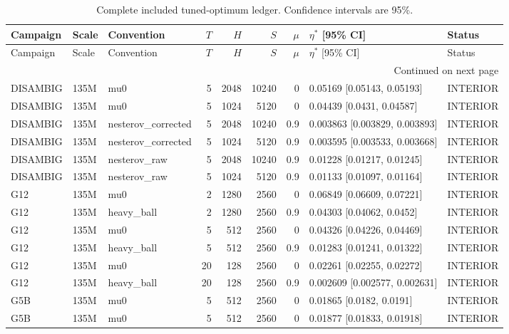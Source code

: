 \begingroup\scriptsize
\setlength{\tabcolsep}{3.2pt}
\begin{longtable}{lllrrrrll}
\caption{Complete included tuned-optimum ledger. Confidence intervals are 95\%.}\label{tab:law-optima}\\
\toprule
Campaign & Scale & Convention & $T$ & $H$ & $S$ & $\mu$ & $\eta^*$ [95\% CI] & Status \\
\midrule
\endfirsthead
\toprule
Campaign & Scale & Convention & $T$ & $H$ & $S$ & $\mu$ & $\eta^*$ [95\% CI] & Status \\
\midrule
\endhead
\midrule\multicolumn{9}{r}{Continued on next page}\\
\endfoot
\bottomrule
\endlastfoot
DISAMBIG & 135M & mu0 & 5 & 2048 & 10240 & 0 & 0.05169 [0.05143, 0.05193] & INTERIOR \\
DISAMBIG & 135M & mu0 & 5 & 1024 & 5120 & 0 & 0.04439 [0.0431, 0.04587] & INTERIOR \\
DISAMBIG & 135M & nesterov\_corrected & 5 & 2048 & 10240 & 0.9 & 0.003863 [0.003829, 0.003893] & INTERIOR \\
DISAMBIG & 135M & nesterov\_corrected & 5 & 1024 & 5120 & 0.9 & 0.003595 [0.003533, 0.003668] & INTERIOR \\
DISAMBIG & 135M & nesterov\_raw & 5 & 2048 & 10240 & 0.9 & 0.01228 [0.01217, 0.01245] & INTERIOR \\
DISAMBIG & 135M & nesterov\_raw & 5 & 1024 & 5120 & 0.9 & 0.01133 [0.01097, 0.01164] & INTERIOR \\
G12 & 135M & mu0 & 2 & 1280 & 2560 & 0 & 0.06849 [0.06609, 0.07221] & INTERIOR \\
G12 & 135M & heavy\_ball & 2 & 1280 & 2560 & 0.9 & 0.04303 [0.04062, 0.0452] & INTERIOR \\
G12 & 135M & mu0 & 5 & 512 & 2560 & 0 & 0.04326 [0.04226, 0.04469] & INTERIOR \\
G12 & 135M & heavy\_ball & 5 & 512 & 2560 & 0.9 & 0.01283 [0.01241, 0.01322] & INTERIOR \\
G12 & 135M & mu0 & 20 & 128 & 2560 & 0 & 0.02261 [0.02255, 0.02272] & INTERIOR \\
G12 & 135M & heavy\_ball & 20 & 128 & 2560 & 0.9 & 0.002609 [0.002577, 0.002631] & INTERIOR \\
G5B & 135M & mu0 & 5 & 512 & 2560 & 0 & 0.01865 [0.0182, 0.0191] & INTERIOR \\
G5B & 135M & mu0 & 5 & 512 & 2560 & 0 & 0.01877 [0.01833, 0.01918] & INTERIOR \\

\end{longtable}
